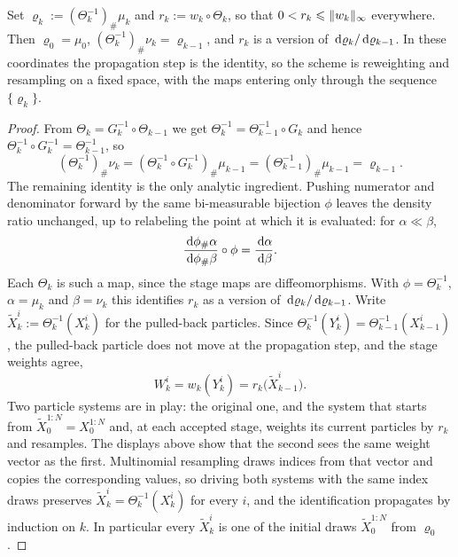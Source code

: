 \documentclass{article}
\begin{document}
\begin{lemma}
\label{lem: appendix-pullback}
Set $\varrho_k := (\Theta_k^{-1})_{\#}\mu_k$ and $r_k := w_k\circ\Theta_k$, so that $0 < r_k \leqslant \lVert w_k\rVert_\infty$ everywhere. Then $\varrho_0=\mu_0$, $(\Theta_k^{-1})_{\#}\nu_k = \varrho_{k-1}$, and $r_k$ is a version of $\,\mathrm d\varrho_k/\,\mathrm d\varrho_{k-1}$. In these coordinates the propagation step is the identity, so the scheme is reweighting and resampling on a fixed space, with the maps entering only through the sequence $\{\varrho_k\}$.
\end{lemma}

\begin{proof}
From $\Theta_k = G_k^{-1}\circ\Theta_{k-1}$ we get $\Theta_k^{-1} = \Theta_{k-1}^{-1}\circ G_k$ and hence $\Theta_k^{-1}\circ G_k^{-1} = \Theta_{k-1}^{-1}$, so
\begin{equation*}
    (\Theta_k^{-1})_{\#}\nu_k = (\Theta_k^{-1}\circ G_k^{-1})_{\#}\mu_{k-1} = (\Theta_{k-1}^{-1})_{\#}\mu_{k-1} = \varrho_{k-1}.
\end{equation*}
The remaining identity is the only analytic ingredient. Pushing numerator and denominator forward by the same bi-measurable bijection $\phi$ leaves the density ratio unchanged, up to relabeling the point at which it is evaluated: for $\alpha\ll\beta$,
\begin{equation}
    \frac{\,\mathrm d\phi_{\#}\alpha}{\,\mathrm d\phi_{\#}\beta}\circ\phi = \frac{\,\mathrm d\alpha}{\,\mathrm d\beta} .
    \label{eq: appendix-cov}
\end{equation}
Each $\Theta_k$ is such a map, since the stage maps are diffeomorphisms. With $\phi=\Theta_k^{-1}$, $\alpha=\mu_k$ and $\beta=\nu_k$ this identifies $r_k$ as a version of $\,\mathrm d\varrho_k/\,\mathrm d\varrho_{k-1}$. Write $\tilde X_k^i := \Theta_k^{-1}(X_k^i)$ for the pulled-back particles. Since $\Theta_k^{-1}(Y_k^i) = \Theta_{k-1}^{-1}(X_{k-1}^i)$, the pulled-back particle does not move at the propagation step, and the stage weights agree,
\begin{equation*}
    W_k^i = w_k(Y_k^i) = r_k\bigl(\tilde X_{k-1}^i\bigr).
\end{equation*}
Two particle systems are in play: the original one, and the system that starts from $\tilde X_0^{1:N} = X_0^{1:N}$ and, at each accepted stage, weights its current particles by $r_k$ and resamples. The displays above show that the second sees the same weight vector as the first. Multinomial resampling draws indices from that vector and copies the corresponding values, so driving both systems with the same index draws preserves $\tilde X_k^i = \Theta_k^{-1}(X_k^i)$ for every $i$, and the identification propagates by induction on $k$. In particular every $\tilde X_k^i$ is one of the initial draws $\tilde X_0^{1:N}$ from $\varrho_0$.
\end{proof}
\end{document}
